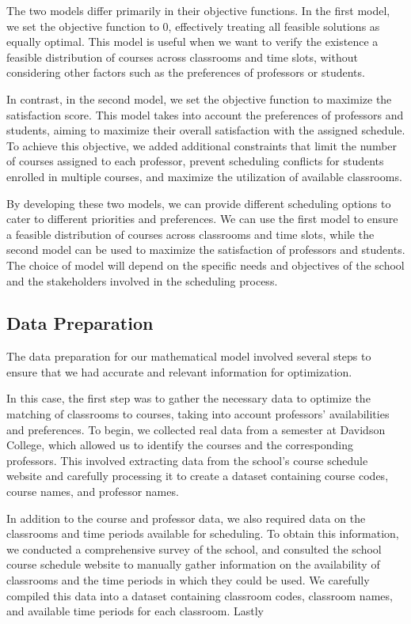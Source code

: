 \documentclass{article}
\begin{document}
The two models differ primarily in their objective functions. In the first model, we set the objective function to 0, effectively treating all feasible solutions as equally optimal. This model is useful when we want to verify the existence a feasible distribution of courses across classrooms and time slots, without considering other factors such as the preferences of professors or students.

In contrast, in the second model, we set the objective function to maximize the satisfaction score. This model takes into account the preferences of professors and students, aiming to maximize their overall satisfaction with the assigned schedule. To achieve this objective, we added additional constraints that limit the number of courses assigned to each professor, prevent scheduling conflicts for students enrolled in multiple courses, and maximize the utilization of available classrooms.

By developing these two models, we can provide different scheduling options to cater to different priorities and preferences. We can use the first model to ensure a feasible distribution of courses across classrooms and time slots, while the second model can be used to maximize the satisfaction of professors and students. The choice of model will depend on the specific needs and objectives of the school and the stakeholders involved in the scheduling process.

\subsection{Data Preparation}

The data preparation for our mathematical model involved several steps to ensure that we had accurate and relevant information for optimization.

In this case, the first step was to gather the necessary data to optimize the matching of classrooms to courses, taking into account professors' availabilities and preferences. To begin, we collected real data from a semester at Davidson College, which allowed us to identify the courses and the corresponding professors. This involved extracting data from the school's course schedule website and carefully processing it to create a dataset containing course codes, course names, and professor names.

In addition to the course and professor data, we also required data on the classrooms and time periods available for scheduling. To obtain this information, we conducted a comprehensive survey of the school, and consulted the school course schedule website to manually gather information on the availability of classrooms and the time periods in which they could be used. We carefully compiled this data into a dataset containing classroom codes, classroom names, and available time periods for each classroom. Lastly
\end{document}

